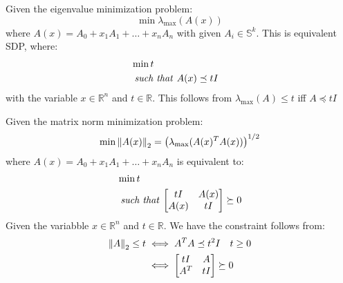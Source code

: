 \begin{proposition}
    Given the eigenvalue minimization problem: 
    \begin{equation*}
        \min \lambda_{\operatorname{max}}(A(x))
    \end{equation*}
    where $A(x) = A_0 + x_1A_1+\dots+x_nA_n$ with given $A_i\in \mathbb{S}^k$. This is equivalent SDP, where:
    \begin{equation*}
    \begin{aligned}
        &\min t \\
        &\text{\emph{ such that }} \begin{aligned}[t]
            &A(x)\preceq tI
        \end{aligned}
    \end{aligned}
    \end{equation*}
    with the variable $x\in \mathbb{R}^n$ and $t\in \mathbb{R}$. This follows from $\lambda_{\operatorname{max}}(A)\le t$ iff $A \preceq tI$
\end{proposition}

\begin{proposition}
    Given the matrix norm minimization problem: 
    \begin{equation*}
        \min\left\lVert A(x)\right\rVert_2 = \left( \lambda_{\max}(A(x)^TA(x)) \right)^{1/2}
    \end{equation*}
    where $A(x) = A_0 + x_1A_1+\dots+x_nA_n$ is equivalent to:
    \begin{equation*}
    \begin{aligned}
        &\min t \\
        &\text{\emph{ such that }} \begin{aligned}[t]
            \begin{bmatrix}
                tI & A(x) \\
                A(x) & tI
            \end{bmatrix} \succeq 0
        \end{aligned}
    \end{aligned}
    \end{equation*}
    Given the variabble $x\in \mathbb{R}^n$ and $t\in \mathbb{R}$. We have the constraint follows from:
    \begin{equation*}
    \begin{aligned} 
        \left\lVert A\right\rVert_2 \le t &\iff A^TA \preceq t^2I \quad t\ge0 \\
        &\iff \begin{bmatrix}
            tI & A \\
            A^T & tI
        \end{bmatrix} \succeq 0
    \end{aligned}
    \end{equation*}
\end{proposition}


